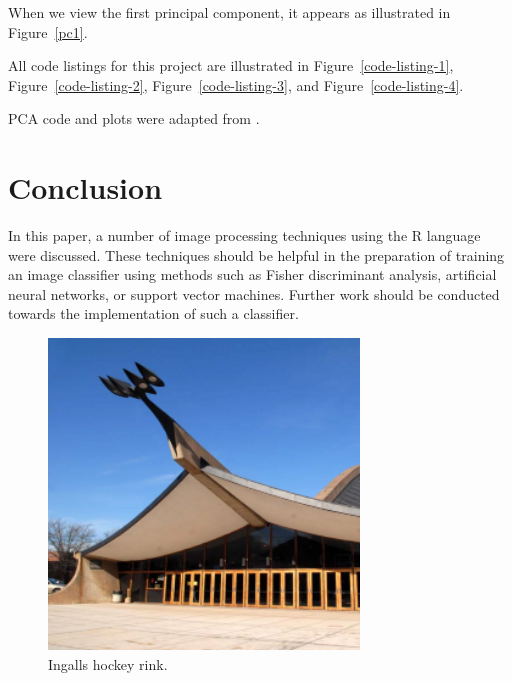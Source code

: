 \documentclass[conference,compsoc]{IEEEtran}
\begin{document}


When we view the first principal component, it appears as illustrated in Figure~\ref{pc1}.

All code listings for this project are illustrated in Figure~\ref{code-listing-1}, Figure~\ref{code-listing-2}, Figure~\ref{code-listing-3}, and Figure~\ref{code-listing-4}.

PCA code and plots were adapted from \cite{datta}.



\section{Conclusion}

In this paper, a number of image processing techniques using the R language were discussed. These techniques should be helpful in the preparation
of training an image classifier using methods such as Fisher discriminant analysis, artificial neural networks, or support vector machines.
Further work should be conducted towards the implementation of such a classifier.

\begin{figure}[!t]
\centering
\includegraphics[width=3.25in]{ingalls.png}
\caption{Ingalls hockey rink.}
\label{ingalls}
\end{figure}
\end{document}
